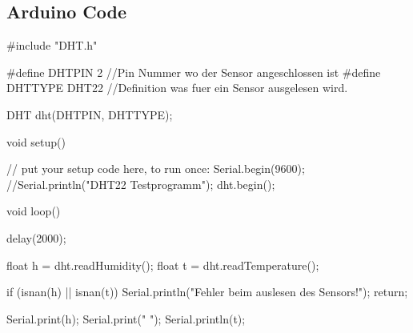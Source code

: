 \documentclass[12pt]{article}
\begin{document}
\subsection{Arduino Code}
\begin{code}
#include "DHT.h"

#define DHTPIN 2 //Pin Nummer wo der Sensor angeschlossen ist
#define DHTTYPE DHT22 //Definition was fuer ein Sensor ausgelesen wird.

DHT dht(DHTPIN, DHTTYPE);

void setup() {
  // put your setup code here, to run once:
  Serial.begin(9600);
  //Serial.println("DHT22 Testprogramm");
  dht.begin();

}

void loop() {
  delay(2000);                     
                                    
  float h = dht.readHumidity();    
  float t = dht.readTemperature();
  
  if (isnan(h) || isnan(t)) {       
    Serial.println("Fehler beim auslesen des Sensors!");
    return;
  }

                   
  Serial.print(h);                 
  Serial.print(" ");                          
  Serial.println(t);
}
\end{code}
\newpage
\end{document}
